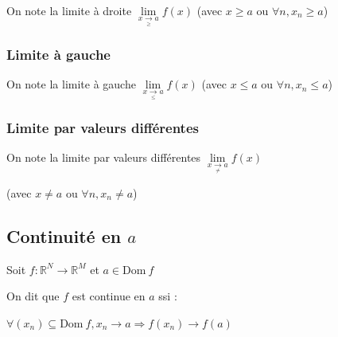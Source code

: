 \documentclass[a4paper,10pt]{article}
\newcommand{\Adh}{\mbox{ Adh }}
\newcommand{\ap}{\rightarrow}
\newcommand{\Dom}{\mathrm{Dom}\:}
\newcommand{\R}{\mathbb{R}}
\newcommand{\so}{\Rightarrow}
\newcommand{\conv}[1]{\mathop{\longrightarrow}\limits_{#1}}
\begin{document}
On note la limite à droite $\lim\limits_{x \conv{\geq} a} f(x)$ (avec $x \geq a$ ou $\forall n, x_n \geq a$)

\subsubsection{Limite à gauche}

On note la limite à gauche $\lim\limits_{x \conv{\leq} a} f(x)$ (avec $x \leq a$ ou $\forall n, x_n \leq a$)

\subsubsection{Limite par valeurs différentes}

On note la limite par valeurs différentes $\lim\limits_{x \conv{\neq} a} f(x)$ 

(avec $x \neq a$ ou $\forall n, x_n \neq a$)

\subsection{Continuité en $a$}

Soit $f : \R^N \ap \R^M$ et $a \in \Dom f$

On dit que $f$ est continue en $a$ ssi :

$\forall (x_n) \subseteq \Dom f, x_n \ap a \so f(x_n) \ap f(a)$










\end{document}
